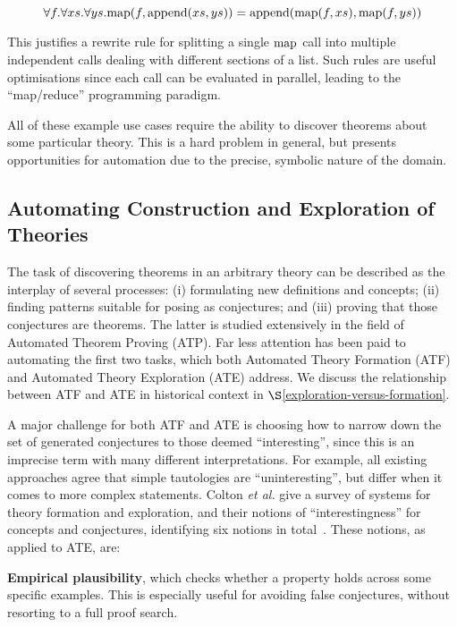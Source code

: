 \begin{equation} \label{eq:mapreduce}
  \forall f. \forall xs. \forall ys.
    \text{map}(f, \text{append}(xs, ys)) = \text{append}(\text{map}(f, xs), \text{map}(f, ys))
\end{equation}

This justifies a rewrite rule for splitting a single $\text{map}$ call into multiple
independent calls dealing with different sections of a list. Such rules are
useful optimisations since each call can be evaluated in parallel, leading to
the ``map/reduce'' programming paradigm.

All of these example use cases require the ability to discover theorems about
some particular theory. This is a hard problem in general, but presents
opportunities for automation due to the precise, symbolic nature of the domain.

\subsection{Automating Construction and Exploration of Theories}
\label{sec:te}

The task of discovering theorems in an arbitrary theory can be
described as the interplay of several processes: (i) formulating new
definitions and concepts; (ii) finding patterns suitable for posing as
conjectures; and (iii) proving that those conjectures are theorems.
The latter is studied extensively in the field of Automated Theorem
Proving (ATP). Far less attention has been paid to automating the
first two tasks, which both Automated Theory Formation (ATF) and
Automated Theory Exploration (ATE) address.  We discuss the
relationship between ATF and ATE in historical context in
$\S$\ref{exploration-versus-formation}.

A major challenge for both ATF and ATE is choosing how to narrow down
the set of generated conjectures to those deemed ``interesting'',
since this is an imprecise term with many different
interpretations. For example, all existing approaches agree that
simple tautologies are ``uninteresting'', but differ when it comes to
more complex statements.  Colton {\em et al.}  give a survey of
systems for theory formation and exploration, and their notions of
``interestingness'' for concepts and conjectures, identifying six
notions in total~\cite{colton2000notion}. These notions, as applied to ATE, are:

{\bf Empirical plausibility}, which checks whether a property holds
across some specific examples. This is especially useful for avoiding
false conjectures, without resorting to a full proof search.

